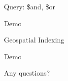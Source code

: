 \documentclass{beamer}
\begin{document}
\begin{frame}{Query: \$and, \$or}


\end{frame}


\begin{frame}%

\begin{center}
   Demo
\end{center}

\end{frame}


\begin{frame}{Geospatial Indexing}
\end{frame}


\begin{frame}%

\begin{center}
   Demo
\end{center}

\end{frame}





\begin{frame} %

\begin{center}
   Any questions?
\end{center}

\end{frame}
\end{document}
